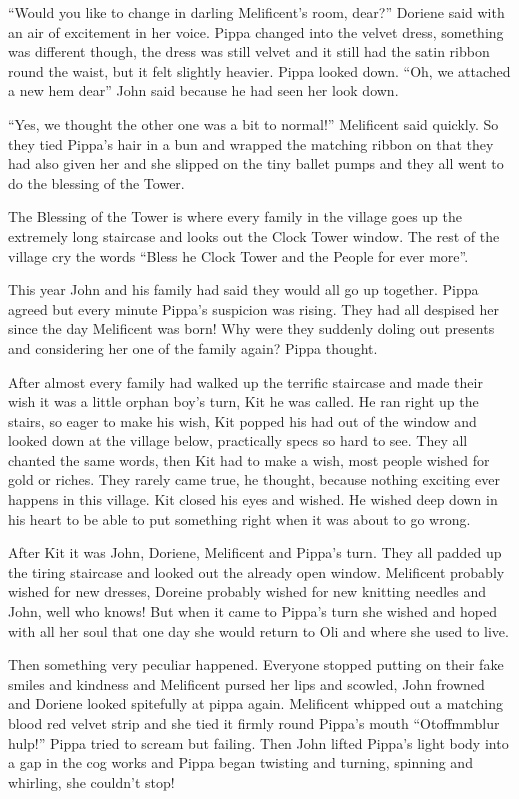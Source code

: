 ``Would you like to change in darling Melificent's room, dear?'' Doriene
said with an air of excitement in her voice. Pippa changed into the
velvet dress, something was different though, the dress was still velvet
and it still had the satin ribbon round the waist, but it felt slightly
heavier. Pippa looked down. ``Oh, we attached a new hem dear'' John said
because he had seen her look down.

``Yes, we thought the other one was a bit to normal!'' Melificent said
quickly. So they tied Pippa's hair in a bun and wrapped the matching
ribbon on that they had also given her and she slipped on the tiny
ballet pumps and they all went to do the blessing of the Tower.

The Blessing of the Tower is where every family in the village goes up
the extremely long staircase and looks out the Clock Tower window. The
rest of the village cry the words ``Bless he Clock Tower and the People
for ever more''.

This year John and his family had said they would all go up together.
Pippa agreed but every minute Pippa's suspicion was rising. They had all
despised her since the day Melificent was born! Why were they suddenly
doling out presents and considering her one of the family again? Pippa
thought.

After almost every family had walked up the terrific staircase and made
their wish it was a little orphan boy's turn, Kit he was called. He ran
right up the stairs, so eager to make his wish, Kit popped his had out
of the window and looked down at the village below, practically specs so
hard to see. They all chanted the same words, then Kit had to make a
wish, most people wished for gold or riches. They rarely came true, he
thought, because nothing exciting ever happens in this village. Kit
closed his eyes and wished. He wished deep down in his heart to be able
to put something right when it was about to go wrong.

After Kit it was John, Doriene, Melificent and Pippa's turn. They all
padded up the tiring staircase and looked out the already open window.
Melificent probably wished for new dresses, Doreine probably wished for
new knitting needles and John, well who knows! But when it came to
Pippa's turn she wished and hoped with all her soul that one day she
would return to Oli and where she used to live.

Then something very peculiar happened. Everyone stopped putting on their
fake smiles and kindness and Melificent pursed her lips and scowled,
John frowned and Doriene looked spitefully at pippa again. Melificent
whipped out a matching blood red velvet strip and she tied it firmly
round Pippa's mouth ``Otoffmmblur hulp!'' Pippa tried to scream but
failing. Then John lifted Pippa's light body into a gap in the cog works
and Pippa began twisting and turning, spinning and whirling, she
couldn't stop!

